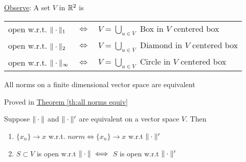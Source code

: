 \underline{Observe}: A set $V$ in $\mathbb{R}^2$ is
\begin{center}
	\begin{tabular}{lcl}
		open w.r.t. $\|\cdot\|_1$ & $\iff$ & $V=\bigcup\limits_{u\in V}$ Box in $V$ centered box\\
		open w.r.t. $\|\cdot\|_2$ & $\iff$ & $V=\bigcup\limits_{u\in V}$ Diamond in $V$ centered box\\
		open w.r.t. $\|\cdot\|_{\infty}$ & $\iff$ & $V=\bigcup\limits_{u\in V}$ Circle in $V$ centered box
	\end{tabular}
\end{center}
\begin{theorem}{}{}
	All norms on a finite dimensional vector space are equivalent
\end{theorem}
\begin{myproof}
	Proved in \hyperref[th:all norms equiv]{Theorem \ref{th:all norms equiv}}
\end{myproof}
\begin{theorem}{}{}
	Suppose $\|\cdot\|$ and $\|\cdot\|'$ are equivalent on a vector space $V$. Then \begin{enumerate}[label=(\roman*)]
		\item $\{x_n\}\to x$ w.r.t. $norm\iff \{x_n\}\to x$ w.r.t $\|\cdot\|'$
		\item $S\subset V$ is open w.r.t $\|\cdot\|\iff$ $S$ is open w.r.t $\|\cdot\|'$
	\end{enumerate}
\end{theorem}
